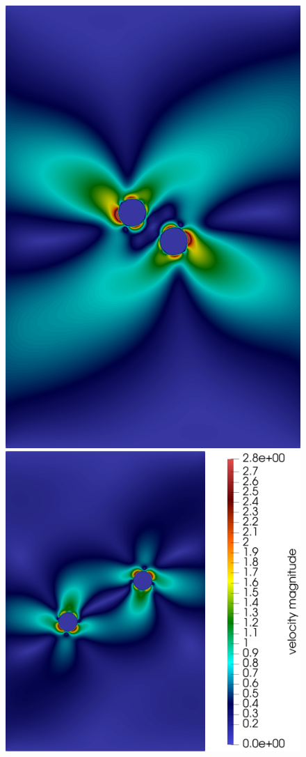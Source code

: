 \documentclass[graybox]{svmult}
\begin{document}
\begin{figure}
	\includegraphics[scale=0.14]{Figures/squirmer/t=3.5.png}
	\includegraphics[scale=0.14]{Figures/squirmer/t=8_.png}


\end{figure}
\end{document}
